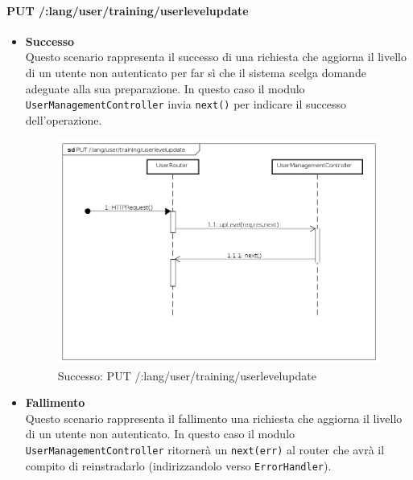 \paragraph{PUT /:lang/user/training/userlevelupdate}
\begin{itemize}
\item \textbf{Successo}\\
Questo scenario rappresenta il successo di una richiesta che aggiorna il livello di un utente non autenticato per far sì che il sistema scelga domande adeguate alla sua preparazione. In questo caso il modulo \texttt{UserManagementController} invia \texttt{next()} per indicare il successo dell'operazione.

\begin{figure}[ht]
	\centering
	\includegraphics[scale=0.45]{UML/DiagrammiDiSequenza/Back-end/PUT__lang_user_training_userlevelupdate_success.png}
	\caption{Successo: PUT /:lang/user/training/userlevelupdate}
\end{figure}
\FloatBarrier

\item \textbf{Fallimento}\\
Questo scenario rappresenta il fallimento una richiesta che aggiorna il livello di un utente non autenticato. In questo caso il modulo \texttt{UserManagementController} ritornerà un \texttt{next(err)} al router che avrà il compito di reinstradarlo (indirizzandolo verso \texttt{ErrorHandler}).


\end{itemize}
